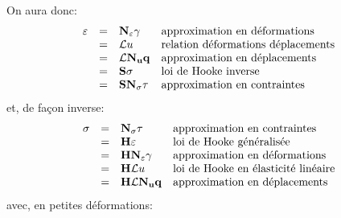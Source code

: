 \medskip
On aura donc:
\begin{equation}
   \begin{array}{rcll}
   \varepsilon &=& \mathbf{N_\varepsilon}\mathbf{\gamma}
                      &\text{approximation en dé{}formations}\\
                    &=& \mathbf{\mathcal{L}}u
                      &\text{relation dé{}formations dé{}placements}\\
                    &=& \mathbf{\mathcal{L}}\mathbf{N_u}\mathbf{q}
                      &\text{approximation en dé{}placements}\\
                    &=& \mathbf{S}\sigma
                      &\text{loi de Hooke inverse}\\
                    &=& \mathbf{S}\mathbf{N_\sigma}\mathbf{\tau}
                      &\text{approximation en contraintes}
   \end{array}
\end{equation}
et, de fa\c{c}on inverse:
\begin{equation}
   \begin{array}{rcll}
   \sigma &=& \mathbf{N_\sigma}\mathbf{\tau}
                      &\text{approximation en contraintes}\\
                    &=& \mathbf{H}\varepsilon
                      &\text{loi de Hooke gé{}né{}ralisé{}e}\\
                    &=& \mathbf{H}\mathbf{N_\varepsilon}\mathbf{\gamma}
                      &\text{approximation en dé{}formations}\\
                    &=& \mathbf{H}\mathbf{\mathcal{L}}u
                      &\text{loi de Hooke en é{}lasticité{} liné{}aire}\\
                    &=& \mathbf{H}\mathbf{\mathcal{L}}\mathbf{N_u}\mathbf{q}
                      &\text{approximation en dé{}placements}
   \end{array}
\end{equation}
avec, en petites déformations:
